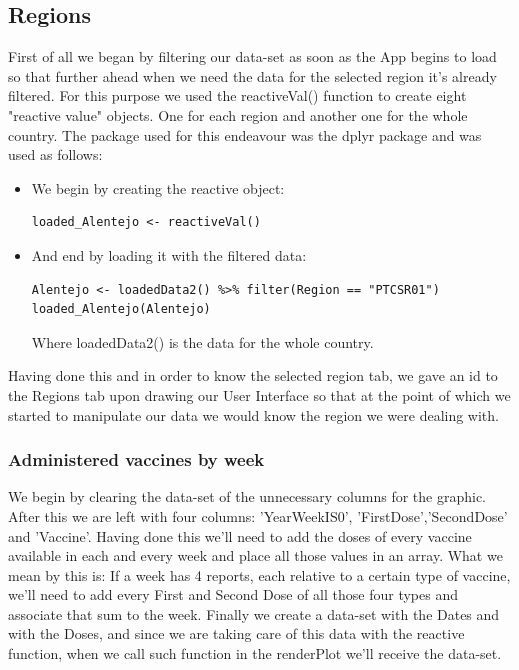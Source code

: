 \subsection{Regions}

First of all we began by filtering our data-set as soon as the App begins to load so that further ahead when we need the data for the selected region it's already filtered. For this purpose we used the reactiveVal() function to create eight "reactive value" objects. One for each region and another one for the whole country. The package used for this endeavour was the dplyr package and was used as follows:
\begin{itemize}
\item We begin by creating the reactive object:

\begin{verbatim}
loaded_Alentejo <- reactiveVal()
\end{verbatim}

\item And end by loading it with the filtered data:

\begin{verbatim}
Alentejo <- loadedData2() %>% filter(Region == "PTCSR01")
loaded_Alentejo(Alentejo)
\end{verbatim}

Where loadedData2() is the data for the whole country.
\end{itemize}
Having done this and in order to know the selected region tab, we gave an id to the Regions tab upon drawing our User Interface so that at the point of which we started to manipulate our data we would know the region we were dealing with. 

\subsubsection{Administered vaccines by week}

We begin by clearing the data-set of the unnecessary columns for the graphic. After this we are left with four columns: 'YearWeekIS0', 'FirstDose','SecondDose' and 'Vaccine'. 
Having done this we'll need to add the doses of every vaccine available in each and every week and place all those values in an array. What we mean by this is: If a week has 4 reports, each relative to a certain type of vaccine, we'll need to add every First and Second Dose of all those four types and associate that sum to the week.
Finally we create a data-set with the Dates and with the Doses, and since we are taking care of this data with the reactive function, when we call such function in the renderPlot we'll receive the data-set.

